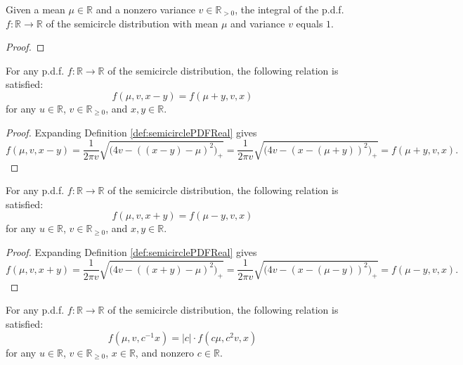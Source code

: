 \begin{lemma}\label{lem:integral_semicirclePDFReal_eq_one}
    \notready
    Given a mean $\mu \in \mathbb{R}$ and a nonzero variance $v \in \mathbb{R}_{> 0}$, the integral of the p.d.f. $f : \mathbb{R} \rightarrow \mathbb{R}$ 
    of the semicircle distribution with mean $\mu$ and variance $v$ equals $1$.
\end{lemma}
\begin{proof}
\end{proof}
\begin{lemma}\label{lem:semicirclePDFReal_sub}
    \mathlibok
    For any p.d.f. $f : \mathbb{R} \rightarrow \mathbb{R}$ 
    of the semicircle distribution, the following relation is satisfied:
    \[
    f(\mu,v,x-y) = f(\mu+y,v,x)
    \]
    for any $u \in \mathbb{R}$, $v \in \mathbb{R}_{\geq 0}$, and $x,y \in \mathbb{R}$. 
\end{lemma}
\begin{proof}
   Expanding Definition \ref{def:semicirclePDFReal} gives
   \[
   f(\mu,v,x-y) 
   = \frac{1}{2πv} \sqrt{\bigl( 4v - ( (x - y) - μ)^2 \bigl)_+} 
   = \frac{1}{2πv} \sqrt{\bigl( 4v - (x - (μ + y))^2 \bigl)_+}
   = f(\mu+y,v,x).
   \]
\end{proof}
\begin{lemma}\label{lem:semicirclePDFReal_add}
    \mathlibok
    For any p.d.f. $f : \mathbb{R} \rightarrow \mathbb{R}$ 
    of the semicircle distribution, the following relation is satisfied:
    \[
    f(\mu,v,x+y) = f(\mu-y,v,x)
    \]
    for any $u \in \mathbb{R}$, $v \in \mathbb{R}_{\geq 0}$, and $x,y \in \mathbb{R}$. 
\end{lemma}
\begin{proof}
   Expanding Definition \ref{def:semicirclePDFReal} gives
   \[
   f(\mu,v,x+y) 
   = \frac{1}{2πv} \sqrt{\bigl( 4v - ( (x + y) - μ)^2 \bigl)_+} 
   = \frac{1}{2πv} \sqrt{\bigl( 4v - (x - (μ - y))^2 \bigl)_+}
   = f(\mu-y,v,x).
   \]
\end{proof}
\begin{lemma}\label{lem:semicirclePDFReal_inv_mul}
    \notready
    For any p.d.f. $f : \mathbb{R} \rightarrow \mathbb{R}$ 
    of the semicircle distribution, the following relation is satisfied:
    \[
    f(\mu,v,c^{-1} x) = |c| \cdot f(c \mu,c^2 v,x)
    \]
    for any $u \in \mathbb{R}$, $v \in \mathbb{R}_{\geq 0}$, $x \in \mathbb{R}$, and nonzero $c \in \mathbb{R}$. 
\end{lemma}
